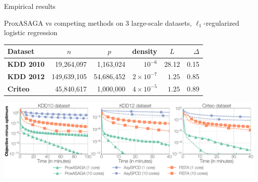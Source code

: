 \documentclass[10pt, notes]{beamer}
\begin{document}
\begin{frame}{Empirical results}




ProxASAGA vs competing methods on 3 large-scale datasets, $\ell_1$-regularized logistic regression

\vspace{0em}\begingroup
\fontsize{9pt}{10pt}\selectfont
\begin{table}
\centering
\begin{tabular}{lrrrrr}
\toprule
{\bfseries\sffamily Dataset} & \multicolumn{1}{c}{$n$} & \multicolumn{1}{c}{$p$} & {{density}} & \multicolumn{1}{c}{$L$} & $\Delta$\\
\midrule
{\bfseries\sffamily KDD 2010} & \hfill 19,264,097 & \hfill 1,163,024 & \hfill $10^{-6}$ & \hfill 28.12 & 0.15\\
{\bfseries\sffamily KDD 2012} & \hfill 149,639,105 & \hfill 54,686,452 & \hfill $2 \times 10^{-7}$ & \hfill $1.25$ & 0.85\\
{\bfseries\sffamily Criteo} & \hfill 45,840,617 & \hfill 1,000,000 & \hfill $4 \times 10^{-5}$ & \hfill $1.25$ & 0.89\\
\bottomrule
\end{tabular}
\end{table}
\endgroup


\includegraphics[width=1\linewidth]{img/prox_asaga_1}

\end{frame}
\end{document}
